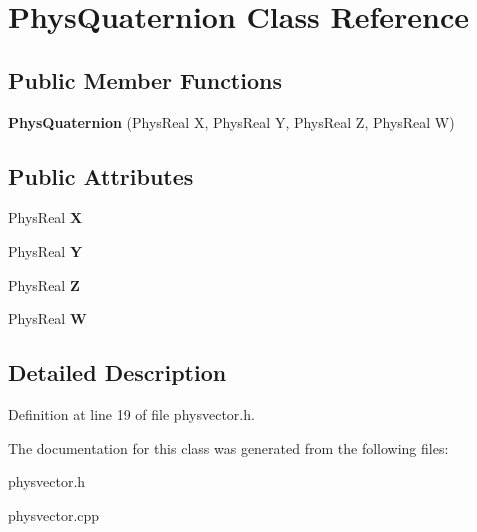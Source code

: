\hypertarget{classPhysQuaternion}{
\section{PhysQuaternion Class Reference}
\label{d5/d19/classPhysQuaternion}
}
\subsection*{Public Member Functions}
\begin{DoxyCompactItemize}
\item 
\hypertarget{classPhysQuaternion_aa0cbd53e7a9e624a3f0f22aa94618e17}{
{\bfseries PhysQuaternion} (PhysReal X, PhysReal Y, PhysReal Z, PhysReal W)}
\label{d5/d19/classPhysQuaternion_aa0cbd53e7a9e624a3f0f22aa94618e17}

\end{DoxyCompactItemize}
\subsection*{Public Attributes}
\begin{DoxyCompactItemize}
\item 
\hypertarget{classPhysQuaternion_ac6ef4975979103a0285379e166dafc9c}{
PhysReal {\bfseries X}}
\label{d5/d19/classPhysQuaternion_ac6ef4975979103a0285379e166dafc9c}

\item 
\hypertarget{classPhysQuaternion_a2b07bc54cfd68f82588cb869f8ef4428}{
PhysReal {\bfseries Y}}
\label{d5/d19/classPhysQuaternion_a2b07bc54cfd68f82588cb869f8ef4428}

\item 
\hypertarget{classPhysQuaternion_a991d092617466f15ab7c297059668cf2}{
PhysReal {\bfseries Z}}
\label{d5/d19/classPhysQuaternion_a991d092617466f15ab7c297059668cf2}

\item 
\hypertarget{classPhysQuaternion_a5569a775ccde5755ffa4a12a0a31c555}{
PhysReal {\bfseries W}}
\label{d5/d19/classPhysQuaternion_a5569a775ccde5755ffa4a12a0a31c555}

\end{DoxyCompactItemize}


\subsection{Detailed Description}


Definition at line 19 of file physvector.h.

The documentation for this class was generated from the following files:\begin{DoxyCompactItemize}
\item 
physvector.h\item 
physvector.cpp\end{DoxyCompactItemize}

